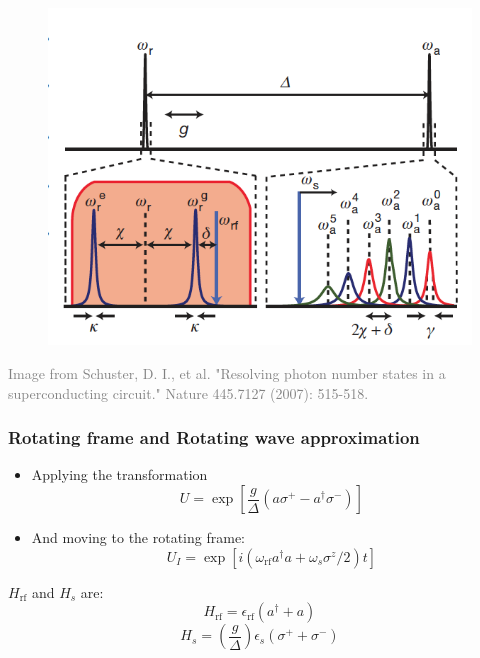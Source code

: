\documentclass[xcolor=dvipsnames,hyperref={CJKbookmarks=true}]{beamer}
\newcommand{\rf}{\text{rf}}
\begin{document}
\begin{frame}
\begin{figure}
\centering
\includegraphics[width=0.7\linewidth]{TransitionLines}
\end{figure}
\tiny{\textcolor{gray}{Image from Schuster, D. I., et al. "Resolving photon number states in a superconducting circuit." Nature 445.7127 (2007): 515-518.\cite{schuster2007resolving}}}
\end{frame}

\begin{frame}
\frametitle{Rotating frame and Rotating wave approximation}
\begin{itemize}
\item Applying the transformation
$$U=\exp\left[\dfrac{g}{\Delta}\left(a\sigma^{+}-a^{\dagger}\sigma^{-} \right)\right]$$
\item And moving to the rotating frame:
$$U_I=\exp\left[i\left(\omega_{\rf}a^{\dagger}a +\omega_s\sigma^{z}/2 \right)t\right]$$
\end{itemize}
$H_{\rf}$ and $H_{s}$ are:
$$H_{\rf} = \epsilon_{\rf}\left(a^{\dagger}+a\right)$$
$$H_{s} = \left(\frac{g}{\Delta}\right)\epsilon_{s}\left(\sigma^{+}+\sigma^{-} \right)$$
\end{frame}
\end{document}
